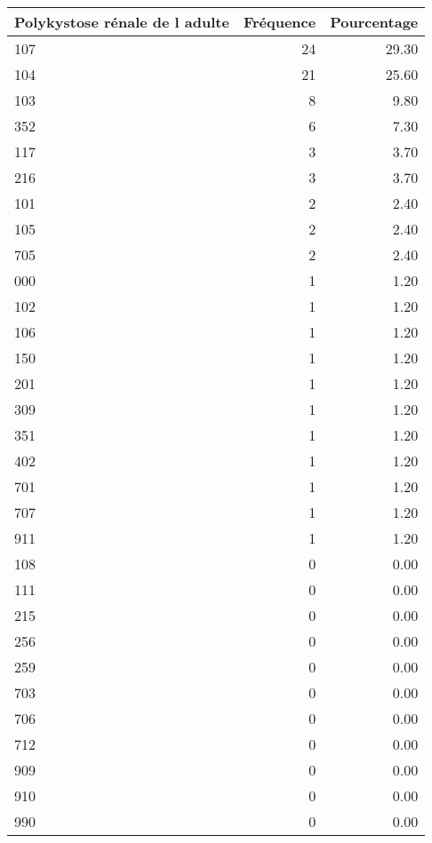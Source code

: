\documentclass[11pt,a4paper]{article}\usepackage[]{graphicx}\usepackage[]{color}
\begin{document}
\begin{table}[H]
\centering
\begin{tabular}{lrr}
  \hline
Polykystose rénale de l adulte & Fréquence & Pourcentage \\ 
  \hline
107 &  24 & 29.30 \\ 
  104 &  21 & 25.60 \\ 
  103 &   8 & 9.80 \\ 
  352 &   6 & 7.30 \\ 
  117 &   3 & 3.70 \\ 
  216 &   3 & 3.70 \\ 
  101 &   2 & 2.40 \\ 
  105 &   2 & 2.40 \\ 
  705 &   2 & 2.40 \\ 
  000 &   1 & 1.20 \\ 
  102 &   1 & 1.20 \\ 
  106 &   1 & 1.20 \\ 
  150 &   1 & 1.20 \\ 
  201 &   1 & 1.20 \\ 
  309 &   1 & 1.20 \\ 
  351 &   1 & 1.20 \\ 
  402 &   1 & 1.20 \\ 
  701 &   1 & 1.20 \\ 
  707 &   1 & 1.20 \\ 
  911 &   1 & 1.20 \\ 
  108 &   0 & 0.00 \\ 
  111 &   0 & 0.00 \\ 
  215 &   0 & 0.00 \\ 
  256 &   0 & 0.00 \\ 
  259 &   0 & 0.00 \\ 
  703 &   0 & 0.00 \\ 
  706 &   0 & 0.00 \\ 
  712 &   0 & 0.00 \\ 
  909 &   0 & 0.00 \\ 
  910 &   0 & 0.00 \\ 
  990 &   0 & 0.00 \\ 
   \hline
\end{tabular}
\end{table}
\end{document}
